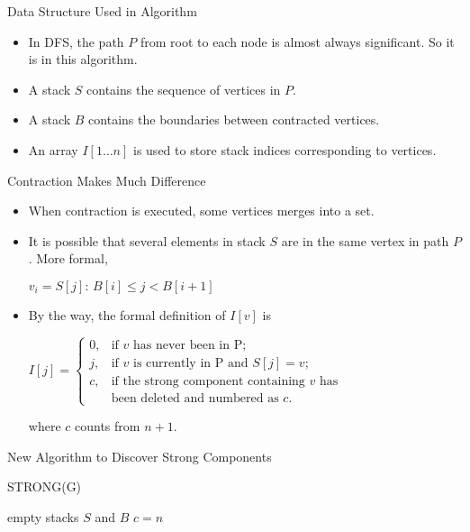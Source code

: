 \documentclass{beamer}
\begin{document}
\begin{frame}{Data Structure Used in Algorithm}
	\begin{itemize}
		\item
		In DFS, the \alert{path $P$} from root to each node is almost always significant. So it is in this algorithm.
		\item
		A \alert{stack $S$} contains the sequence of vertices in $P$.
		\item
		A \alert{stack $B$} contains the boundaries between contracted vertices.
		\item
		An array \alert{$I[1\ldots n]$} is used to store stack indices corresponding to vertices.
	\end{itemize}
\end{frame}

\begin{frame}{Contraction Makes Much Difference}
	\begin{itemize}
		\item
		When contraction is executed, some vertices merges into a set.
		\item
		It is possible that several elements in stack $S$ are in the same vertex in path $P$.
		More formal, 
		\begin{center}
			$v_i={S[j]:\, B[i]\leq j< B[i+1]}$
		\end{center}
		\item
		By the way, the formal definition of $I[v]$ is
		\begin{center}
			$I[j]=\begin{cases}
			0, & \text{if }v\text{ has never been in P;} \\
			j, & \text{if }v\text{ is currently in P and }S[j]=v\text{;} \\
			c, & \text{if the strong component containing }v\text{ has}\\
			& \text{been deleted and numbered as }c\text{.}
			\end{cases}$
		\end{center}
		where $c$ counts from $n+1$.
	\end{itemize}
\end{frame}

\begin{frame}[fragile]{New Algorithm to Discover Strong Components}
	\SetAlFnt{\normalsize}
	\begin{procedure}[H]
		\caption{STRONG(G)}
		empty stacks $S$ and $B$\;
		$c=n$\;
	\end{procedure}
\end{frame}
\end{document}
